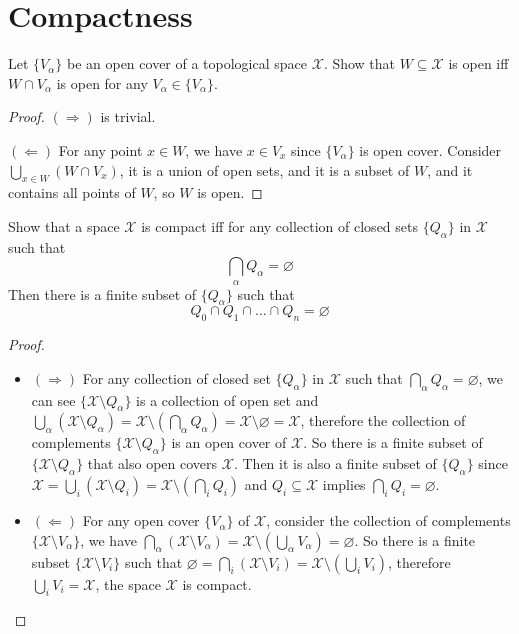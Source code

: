\documentclass[./main.tex]{subfiles}
\begin{document}
\section{Compactness}

\begin{exercise}
  Let $\{V_\alpha\}$ be an open cover of a topological space $\mathcal{X}$.
  Show that $W \subseteq \mathcal{X}$ is open iff $W \cap V_\alpha$ is open for any
  $V_\alpha \in \{V_\alpha\}$.
\end{exercise}
\begin{proof}
  $(\Rightarrow)$ is trivial. \par
  $(\Leftarrow)$ For any point $x \in W$, we have $x \in V_x$ since $\{V_\alpha\}$ is open cover.
  Consider $\bigcup_{x \in W} (W \cap V_x)$, it is a union of open sets, and it is a subset of $W$,
  and it contains all points of $W$, so $W$ is open.
\end{proof}

\begin{theorem}
  Show that a space $\mathcal{X}$ is compact iff for any collection of closed sets
  $\{Q_\alpha\}$ in $\mathcal{X}$ such that
  \[
  \bigcap_\alpha Q_\alpha = \varnothing
  \]
  Then there is a finite subset of $\{Q_\alpha\}$ such that
  \[
  Q_0 \cap Q_1 \cap \dots \cap Q_n = \varnothing
  \]
\end{theorem}
\begin{proof}
  ~
  \begin{itemize}
    \item $(\Rightarrow)$ For any collection of closed set $\{Q_\alpha\}$ in $\mathcal{X}$
      such that $\bigcap_\alpha Q_\alpha = \varnothing$, we can see
      $\{ \mathcal{X} \setminus Q_\alpha \}$ is a collection of open set and
      $\bigcup_\alpha (\mathcal{X} \setminus Q_\alpha) = \mathcal{X} \setminus (\bigcap_\alpha Q_\alpha) = \mathcal{X} \setminus \varnothing = \mathcal{X}$,
      therefore the collection of complements $\{\mathcal{X} \setminus Q_\alpha \}$ is an open cover of $\mathcal{X}$.
      So there is a finite subset of $\{ \mathcal{X} \setminus Q_\alpha \}$ that
      also open covers $\mathcal{X}$. Then it is also a finite subset of $\{ Q_\alpha \}$
      since $\mathcal{X} = \bigcup_i (\mathcal{X} \setminus Q_i) = \mathcal{X} \setminus (\bigcap_i Q_i)$
      and $Q_i \subseteq \mathcal{X}$ implies $\bigcap_i Q_i = \varnothing$.
    \item $(\Leftarrow)$ For any open cover $\{ V_\alpha \}$ of $\mathcal{X}$,
      consider the collection of complements $\{ \mathcal{X} \setminus V_\alpha \}$,
      we have $\bigcap_\alpha (\mathcal{X} \setminus V_\alpha) = \mathcal{X} \setminus (\bigcup_\alpha V_\alpha) = \varnothing$.
      So there is a finite subset $\{ \mathcal{X} \setminus V_i \}$ such that
      $\varnothing = \bigcap_i (\mathcal{X} \setminus V_i) = \mathcal{X} \setminus (\bigcup_i V_i)$,
      therefore $\bigcup_i V_i = \mathcal{X}$, the space $\mathcal{X}$ is compact.
  \end{itemize}
\end{proof}
\end{document}
